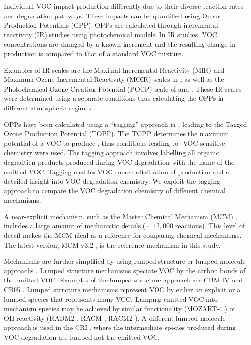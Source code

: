 Individual VOC impact  production differently due to their diverse reaction rates and degradation pathways. 
These impacts can be quantified using Ozone Production Potentials (OPP).
OPPs are calculated through incremental reactivity (IR) studies using photochemical models. 
In IR studies, VOC concentrations are changed by a known increment and the resulting change in  production is compared to that of a standard VOC mixture. 

Examples of IR scales are the Maximal Incremental Reactivity (MIR) and Maximum Ozone Incremental Reactivity (MOIR) scales in \citet{Carter:1994}, as well as the Photochemical Ozone Creation Potential (POCP) scale of \citet{Derwent:1996} and \citet{Derwent:1998}. 
These IR scales were determined using a separate  conditions thus calculating the OPPs in different atmospheric regimes.

OPPs have been calculated using a ``tagging'' approach in \citet{Butler:2011}, leading to the Tagged Ozone Production Potential (TOPP). 
The TOPP determines the maximum potential of a VOC to produce , thus  conditions leading to -VOC-sensitive chemistry were used.
The tagging approach involves labelling all organic degradtion products produced during VOC degradation with the name of the emitted VOC.
Tagging enables VOC source attribution of  production and a detailed insight into VOC degradation chemistry.
We exploit the tagging approach to compare the VOC degradation chemistry of different chemical mechanisms. 

A near-explicit mechanism, such as the Master Chemical Mechanism (MCM) \citep{Jenkin:2003, Saunders:2003, Bloss:2005}, includes a large amount of mechanistic details ($\sim$ $12,000$ reactions). 
This level of detail makes the MCM ideal as a reference for comparing chemical mechanisms.
The latest version, MCM v3.2 \citep{MCM_Site}, is the reference mechanism in this study.

Mechanisms are further simplified by using lumped structure or lumped molecule approachs \citep{Dodge:2000}. 
Lumped structure mechanisms speciate VOC by the carbon bonds of the emitted VOC.
Examples of the lumped structure approach are CBM-IV \citep{Gery:1989} and CB05 \citep{Yarwood:2005}.
Lumped structure mechanisms represent VOC by either an explicit or a lumped species that represents many VOC. 
Lumping emitted VOC into mechanism species may be achieved by similar functionality (MOZART-4 \citep{Emmons:2010}) or OH-reactivity (RADM2 \citep{Stockwell:1990}, RACM \citep{Stockwell:1997}, RACM2 \citep{Goliff:2013}).
A different lumped molecule approach is used in the CRI \citep{Jenkin:2008}, where the intermediate species produced during VOC degradation are lumped not the emitted VOC.

